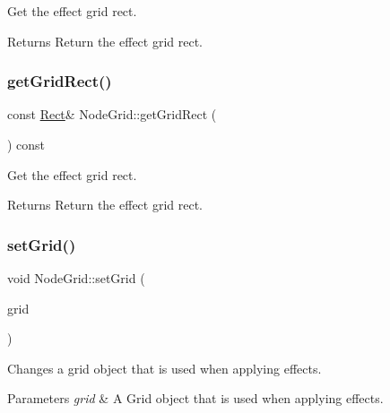 Get the effect grid rect. 

\begin{DoxyReturn}{Returns}
Return the effect grid rect. 
\end{DoxyReturn}
\mbox{\label{classNodeGrid_a8116f72215e420c5d075a590a53d24a3}} 
\subsubsection{\texorpdfstring{get\+Grid\+Rect()}{getGridRect()}\hspace{0.1cm}{\footnotesize\ttfamily [2/2]}}
{\footnotesize\ttfamily const \hyperlink{classRect}{Rect}\& Node\+Grid\+::get\+Grid\+Rect (\begin{DoxyParamCaption}{ }\end{DoxyParamCaption}) const\hspace{0.3cm}{\ttfamily [inline]}}



Get the effect grid rect. 

\begin{DoxyReturn}{Returns}
Return the effect grid rect. 
\end{DoxyReturn}
\mbox{\label{classNodeGrid_ac30e6f445f2a72e44ff7afeef2afb0ef}} 
\subsubsection{\texorpdfstring{set\+Grid()}{setGrid()}\hspace{0.1cm}{\footnotesize\ttfamily [1/2]}}
{\footnotesize\ttfamily void Node\+Grid\+::set\+Grid (\begin{DoxyParamCaption}\item[{\hyperlink{classGridBase}{Grid\+Base} $\ast$}]{grid }\end{DoxyParamCaption})}

Changes a grid object that is used when applying effects.


\begin{DoxyParams}{Parameters}
{\em grid} & A Grid object that is used when applying effects. \\
\hline
\end{DoxyParams}
\mbox{\label{classNodeGrid_ac30e6f445f2a72e44ff7afeef2afb0ef}} 
